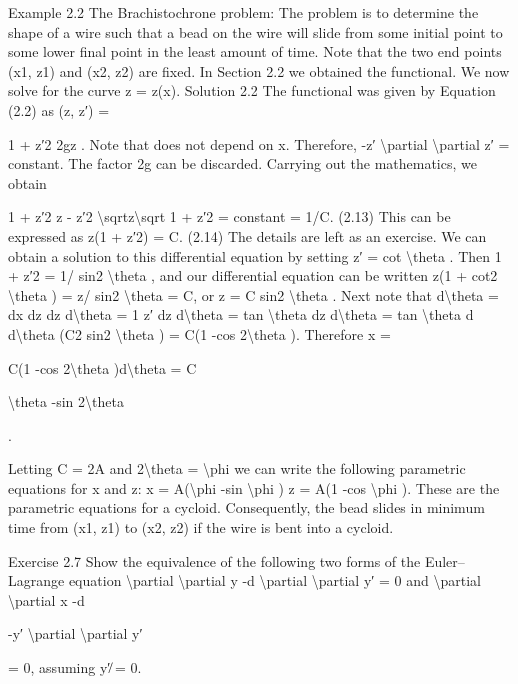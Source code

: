 \begin{example}
Example 2.2 The Brachistochrone problem: The problem is to determine the
shape of a wire such that a bead on the wire will slide from some initial point to
some lower final point in the least amount of time. Note that the two end points
(x1, z1) and (x2, z2) are fixed. In Section 2.2 we obtained the functional. We
now solve for the curve z = z(x).
Solution 2.2 The functional was given by Equation (2.2) as
(z, z′) =

1 + z′2
2gz .
Note that  does not depend on x. Therefore,
-z′ \textbackslash{}partial
\textbackslash{}partial z′ = constant.
The factor 2g can be discarded. Carrying out the mathematics, we obtain

1 + z′2
z
-
z′2
\textbackslash{}sqrtz\textbackslash{}sqrt
1 + z′2 = constant = 1/C.
(2.13)
This can be expressed as
z(1 + z′2) = C.
(2.14)
The details are left as an exercise. We can obtain a solution to this differential
equation by setting
z′ = cot \textbackslash{}theta .
Then 1 + z′2 = 1/ sin2 \textbackslash{}theta , and our differential equation can be written
z(1 + cot2 \textbackslash{}theta ) = z/ sin2 \textbackslash{}theta  = C,
or
z = C sin2 \textbackslash{}theta .
Next note that
d\textbackslash{}theta  = dx
dz
dz
d\textbackslash{}theta  = 1
z′
dz
d\textbackslash{}theta  = tan \textbackslash{}theta  dz
d\textbackslash{}theta  = tan \textbackslash{}theta  d
d\textbackslash{}theta  (C2 sin2 \textbackslash{}theta ) = C(1 -cos 2\textbackslash{}theta ).
Therefore
x =

C(1 -cos 2\textbackslash{}theta )d\textbackslash{}theta  = C

\textbackslash{}theta  -sin 2\textbackslash{}theta

.

Letting C = 2A and 2\textbackslash{}theta  = \textbackslash{}phi  we can write the following parametric equations
for x and z:
x = A(\textbackslash{}phi  -sin \textbackslash{}phi )
z = A(1 -cos \textbackslash{}phi ).
These are the parametric equations for a cycloid. Consequently, the bead slides
in minimum time from (x1, z1) to (x2, z2) if the wire is bent into a cycloid.
\end{example}

\begin{exercise}
Exercise 2.7 Show the equivalence of the following two forms of the
Euler--Lagrange equation
\textbackslash{}partial
\textbackslash{}partial y -d
\textbackslash{}partial
\textbackslash{}partial y′ = 0
and
\textbackslash{}partial
\textbackslash{}partial x -d

-y′ \textbackslash{}partial
\textbackslash{}partial y′

= 0,
assuming y′̸ = 0.
\end{exercise}

